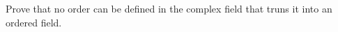 Prove that no order can be defined in the complex field that truns it into an ordered field.

\begin{tcolorbox}
	\begin{solution}
		
	\end{solution}
\end{tcolorbox}